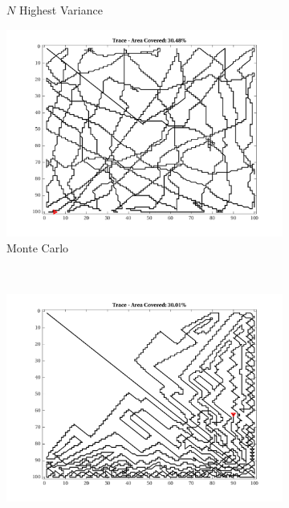 \begin{figure}[htb!]
\begin{subfigure}[t]{0.3333\textwidth}
        \captionsetup{skip=0.20\baselineskip,size=footnotesize}
        \caption{$N$ Highest Variance}
    \end{subfigure}%
    \begin{subfigure}[t]{0.3333\textwidth}
        \centering
        \includegraphics[width=\linewidth]{figures/hbresults/path_mc_30p_100x100_sf_100_seed_2.png}
        \captionsetup{skip=0.20\baselineskip,size=footnotesize}
        \caption{Monte Carlo}
    \end{subfigure}%
    \\
    \begin{subfigure}[t]{0.3333\textwidth}
        \centering
        \includegraphics[width=\linewidth]{figures/hbresults/path_gradient_30p_100x100_sf_100_seed_2.png}

\end{subfigure}
\end{figure}
